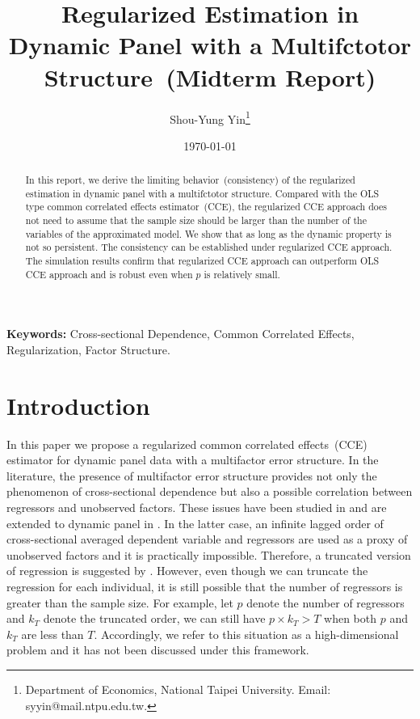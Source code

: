 \documentclass[11pt,a4paper]{article}
\theoremstyle{definition}
\begin{document}
\vspace{-1em}
\title{\huge Regularized Estimation in Dynamic Panel with a Multifctotor Structure~(Midterm Report)\\\vspace{0.3em}}
\author{\Large{
Shou-Yung Yin\thanks{Department of Economics, National Taipei University. Email: syyin@mail.ntpu.edu.tw.}}\vspace{1em}}
\date{\vspace{0.3em}\today}
\maketitle


\begin{abstract}
In this report, we derive the limiting behavior~(consistency) of the regularized estimation in dynamic panel with a multifctotor structure. Compared with the OLS type common correlated effects estimator~(CCE), the regularized CCE approach does not need to assume that the sample size should be larger than the number of the variables of the approximated model. We show that as long as the dynamic property is not so persistent. The consistency can be established under regularized CCE approach. The simulation results confirm that regularized CCE approach can outperform OLS CCE approach and is robust even when $p$ is relatively small. 
\end{abstract}

\noindent
{\bf Keywords:} Cross-sectional Dependence, Common Correlated Effects, Regularization, Factor Structure.


\vspace{1em}

\thispagestyle{empty}
\newpage
{}

\section{Introduction}\label{Sec:Intro}
In this paper we propose a regularized common correlated effects~(CCE) estimator for dynamic panel data with a multifactor error structure. In the literature, the presence of multifactor error structure provides not only the phenomenon of cross-sectional dependence but also a possible correlation between regressors and unobserved factors. These issues have been studied in \citet{Pesaran2006} and are extended to dynamic panel in \citet{Chudik2015}. In the latter case, an infinite lagged order of cross-sectional averaged dependent variable and regressors are used as a proxy of unobserved factors and it is practically impossible. Therefore, a truncated version of regression is suggested by \citet{Chudik2015}. However, even though we can truncate the regression for each individual, it is still possible that the number of regressors is greater than the sample size. For example, let $p$ denote the number of regressors and $k_T$ denote the truncated order, we can still have $p\times k_T>T$ when both $p$ and $k_T$ are less than $T$. Accordingly, we refer to this situation as a high-dimensional problem and it has not been discussed under this framework.
\end{document}
